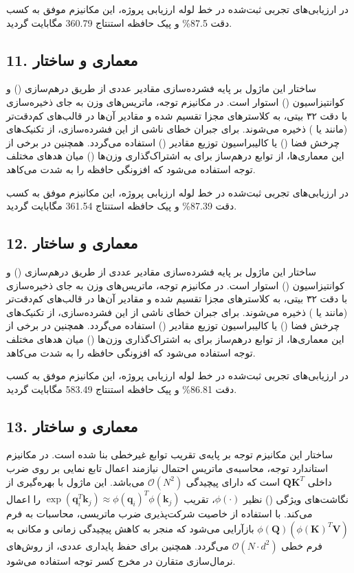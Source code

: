 \documentclass[12pt,a4paper]{report}
\theoremstyle{definition}
\begin{document}
در ارزیابی‌های تجربی ثبت‌شده در خط لوله ارزیابی پروژه، این مکانیزم موفق به کسب دقت 87.5\% و پیک حافظه استنتاج 360.79 مگابایت گردید.

\subsection*{11. معماری و ساختار }
ساختار این ماژول بر پایه فشرده‌سازی مقادیر عددی از طریق درهم‌سازی () و کوانتیزاسیون () استوار است. در مکانیزم توجه، ماتریس‌های وزن به جای ذخیره‌سازی با دقت ۳۲ بیتی، به کلاسترهای مجزا تقسیم شده و مقادیر آن‌ها در قالب‌های کم‌دقت‌تر (مانند  یا ) ذخیره می‌شوند. برای جبران خطای ناشی از این فشرده‌سازی، از تکنیک‌های چرخش فضا () یا کالیبراسیون توزیع مقادیر () استفاده می‌گردد. همچنین در برخی از این معماری‌ها، از توابع درهم‌ساز برای به اشتراک‌گذاری وزن‌ها () میان هد‌های مختلف توجه استفاده می‌شود که افزونگی حافظه را به شدت می‌کاهد.

در ارزیابی‌های تجربی ثبت‌شده در خط لوله ارزیابی پروژه، این مکانیزم موفق به کسب دقت 87.39\% و پیک حافظه استنتاج 361.54 مگابایت گردید.

\subsection*{12. معماری و ساختار }
ساختار این ماژول بر پایه فشرده‌سازی مقادیر عددی از طریق درهم‌سازی () و کوانتیزاسیون () استوار است. در مکانیزم توجه، ماتریس‌های وزن به جای ذخیره‌سازی با دقت ۳۲ بیتی، به کلاسترهای مجزا تقسیم شده و مقادیر آن‌ها در قالب‌های کم‌دقت‌تر (مانند  یا ) ذخیره می‌شوند. برای جبران خطای ناشی از این فشرده‌سازی، از تکنیک‌های چرخش فضا () یا کالیبراسیون توزیع مقادیر () استفاده می‌گردد. همچنین در برخی از این معماری‌ها، از توابع درهم‌ساز برای به اشتراک‌گذاری وزن‌ها () میان هد‌های مختلف توجه استفاده می‌شود که افزونگی حافظه را به شدت می‌کاهد.

در ارزیابی‌های تجربی ثبت‌شده در خط لوله ارزیابی پروژه، این مکانیزم موفق به کسب دقت 86.81\% و پیک حافظه استنتاج 583.49 مگابایت گردید.

\subsection*{13. معماری و ساختار }
ساختار این مکانیزم توجه بر پایه‌ی تقریب توابع غیرخطی بنا شده است. در مکانیزم استاندارد توجه، محاسبه‌ی ماتریس احتمال نیازمند اعمال تابع نمایی بر روی ضرب داخلی $\mathbf{Q} \mathbf{K}^T$ است که دارای پیچیدگی $\mathcal{O}(N^2)$ می‌باشد. این ماژول با بهره‌گیری از نگاشت‌های ویژگی () نظیر $\phi(\cdot)$، تقریب $\exp(\mathbf{q}_i^T \mathbf{k}_j) \approx \phi(\mathbf{q}_i)^T \phi(\mathbf{k}_j)$ را اعمال می‌کند. با استفاده از خاصیت شرکت‌پذیری ضرب ماتریسی، محاسبات به فرم $\phi(\mathbf{Q}) (\phi(\mathbf{K})^T \mathbf{V})$ بازآرایی می‌شود که منجر به کاهش پیچیدگی زمانی و مکانی به فرم خطی $\mathcal{O}(N \cdot d^2)$ می‌گردد. همچنین برای حفظ پایداری عددی، از روش‌های نرمال‌سازی متقارن در مخرج کسر توجه استفاده می‌شود.
\end{document}
